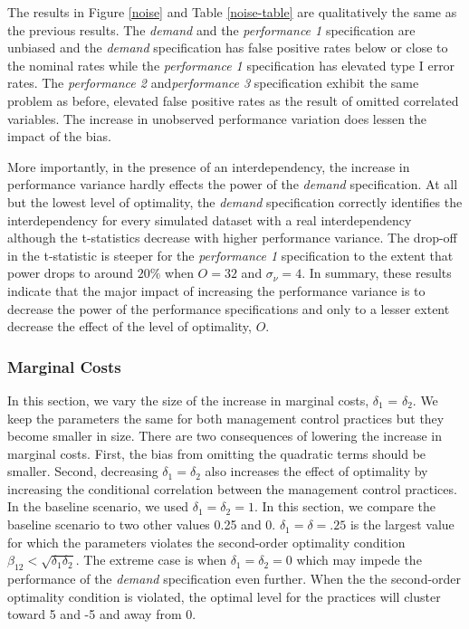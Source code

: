 \documentclass[12pt]{article}
\begin{document}


The results in Figure \ref{noise} and Table \ref{noise-table} are qualitatively the same as the previous results. The \emph{demand} and the \emph{performance 1} specification are unbiased and the \emph{demand} specification has false positive rates below or close to the nominal rates while the \emph{performance 1} specification has elevated type I error rates. The \emph{performance 2} and\emph{performance 3} specification exhibit the same problem as before, elevated false positive rates as the result of omitted correlated variables. The increase in unobserved performance variation does lessen the impact of the bias.

More importantly, in the presence of an interdependency, the increase in performance variance hardly effects the power of the \emph{demand} specification. At all but the lowest level of optimality, the \emph{demand} specification correctly identifies the interdependency for every simulated dataset with a real interdependency although the t-statistics decrease with higher performance variance. The drop-off in the t-statistic is steeper for the \emph{performance 1} specification to the extent that power drops to around \(20\%\) when \(O = 32\) and \(\sigma_{\nu} = 4\). In summary, these results indicate that the major impact of increasing the performance variance is to decrease the power of the performance specifications and only to a lesser extent decrease the effect of the level of optimality, $O$.

\subsubsection{Marginal Costs}\label{marginal-cost}
 
In this section, we vary the size of the increase in marginal costs, \(\delta_1\) = \(\delta_2\). We keep the parameters the same for both management control practices but they become smaller in size. There are two consequences of lowering the increase in marginal costs. First, the bias from omitting the quadratic terms should be smaller. Second, decreasing \(\delta_1 = \delta_2\) also increases the effect of optimality by increasing the conditional correlation between the management control practices.  In the baseline scenario, we used \(\delta_1 = \delta_2 = 1\). In this section, we compare the baseline scenario to two other values 0.25 and 0. \(\delta_1 = \delta = .25\) is the largest value for which the parameters violates the second-order optimality condition \(\beta_{12} < \sqrt{\delta_1 \delta_2}\). The extreme case is when \(\delta_1 = \delta_2 = 0\) which may impede the performance of the \emph{demand} specification even further. When the the second-order optimality condition is violated, the optimal level for the practices will cluster toward 5 and -5 and away from  0. 
\end{document}
